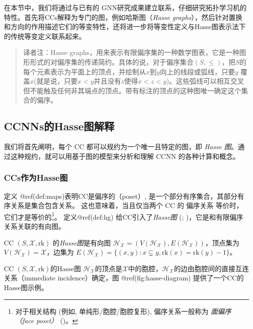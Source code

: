 \documentclass[
  12pt,
]{krantz}
\begin{document}
在本节中，我们将通过与已有的
GNN研究成果建立联系，仔细研究拓扑学习机的特性。首先将CCs解释为专门的图，例如哈斯图（\emph{Hasse
graphs}），然后针对置换和方向的作用描述它们的等变特性，还将进一步将等变性定义与Hasse图表示法下的传统等变定义联系起来。

\begin{quote}
译者注：Hasse
graphs，用来表示有限偏序集的一种数学图表，它是一种图形形式的对偏序集的传递简约。具体的说，对于偏序集合\((S, ≤)\)，把\(S\)的每个元素表示为平面上的顶点，并绘制从\(x\)到\(y\)向上的线段或弧线，只要\(y\)
覆盖\(x\)(就是说，只要\(x < y\)并且没有\(z\)使得\(x < z < y\))。这些弧线可以相互交叉但不能触及任何非其端点的顶点。带有标注的顶点的这种图唯一确定这个集合的偏序。
\end{quote}

\subsection{CCNNs的Hasse图解释}\label{hasse-graph-interpretation-of-ccnns-2}

我们将首先阐明，每个 CC 都可以规约为一个唯一且特定的图，即 \emph{Hasse
图}。通过这种规约，就可以用基于图的模型来分析和理解 CCNN
的各种计算和概念。

\subsubsection{CCs作为Hasse图}\label{ccs-as-hasse-graphs}

定义 @ref(def:maps)表明CC是偏序的（poset）,
是一个部分有序集合，其部分有序关系是集合包含关系。
这也意味着，当且仅当两个 CC 的 偏序关系
等价时，它们才是等价的\footnote{对于相关结构 (例如,
  单纯形/胞腔/胞腔复形), 偏序关系一般称为 \emph{面偏序（face poset）}
  ()。}。 定义@ref(def:hg)
给CC引入了\emph{Hasse图} (;
)，它是和有限偏序关系关联的有向图。

\label{hg}
CC \((S, \mathcal{X},\mbox{rk})\) 的\emph{Hasse图}是有向图
\(\mathcal{H}_{\mathcal{X}}= (V (\mathcal{H}_{\mathcal{X}}), E(\mathcal{H}_{\mathcal{X}}) )\)，顶点集为\(V (\mathcal{H}_{\mathcal{X}})=\mathcal{X}\)，边集为
\(E(\mathcal{H}_{\mathcal{X}})=\{ (x,y) : x\subsetneq y, \mbox{rk}(x)=\mbox{rk}(y)-1 \}\)。

CC \((S, \mathcal{X},\mbox{rk})\)的Hasse图
\(\mathcal{H}_{\mathcal{X}}\)的顶点是\(\mathcal{X}\)中的胞腔，\(\mathcal{H}_{\mathcal{X}}\)的边由胞腔间的直接互连关系（immediate
incidence）确定，图 @ref(fig:hasse-diagram) 提供了一个CC的Hasse图示例。
\end{document}
